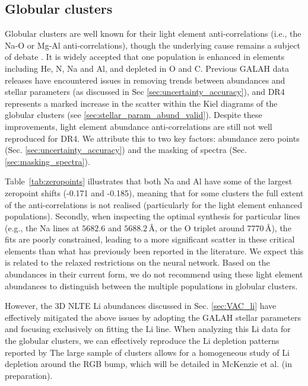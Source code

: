 \documentclass[
  journal=pasa,
  manuscript=research-paper, %
  year=2024,
  volume=37
]{cup-journal}
\begin{document}
\subsection{Globular clusters} \label{sec:caveats_globulars}

Globular clusters are well known for their light element anti-correlations (i.e., the Na-O or Mg-Al anti-correlations), though the underlying cause remains a subject of debate \citep[for recent reviews see][]{Bastian2018, Gratton2019, Milone2022}. It is widely accepted that one population is enhanced in elements including He, N, Na and Al, and depleted in O and C. Previous GALAH data releases have encountered issues in removing trends between abundances and stellar parameters (as discussed in Sec \ref{sec:uncertainty_accuracy}), and DR4 represents a marked increase in the scatter within the Kiel diagrams of the globular clusters (see \ref{sec:stellar_param_abund_valid}). Despite these improvements, light element abundance anti-correlations are still not well reproduced for DR4. We attribute this to two key factors: abundance zero points (Sec. \ref{sec:uncertainty_accuracy}) and the masking of spectra (Sec. \ref{sec:masking_spectra}).

Table~\ref{tab:zeropoints} illustrates that both Na and Al have some of the largest zeropoint shifts (-0.171 and -0.185), meaning that for some clusters the full extent of the anti-correlations is not realised (particularly for the light element enhanced populations). Secondly, when inspecting the optimal synthesis for particular lines (e.g., the Na lines at $5682.6$ and $5688.2\,\text{\AA}$, or the O triplet around $7770\,\text{\AA}$), the fits are poorly constrained, leading to a more significant scatter in these critical elements than what has previously been reported in the literature. We expect this is related to the relaxed restrictions on the neural network. Based on the abundances in their current form, we do not recommend using these light element abundances to distinguish between the multiple populations in globular clusters. 

However, the 3D NLTE Li abundances discussed in Sec. \ref{sec:VAC_li} have effectively mitigated the above issues by adopting the GALAH stellar parameters and focusing exclusively on fitting the Li line. When analyzing this Li data for the globular clusters, we can effectively reproduce the Li depletion patterns reported by \citet{Lind2009b} The large sample of clusters allows for a homogeneous study of Li depletion around the RGB bump, which will be detailed in McKenzie et al. (in preparation).
\end{document}
